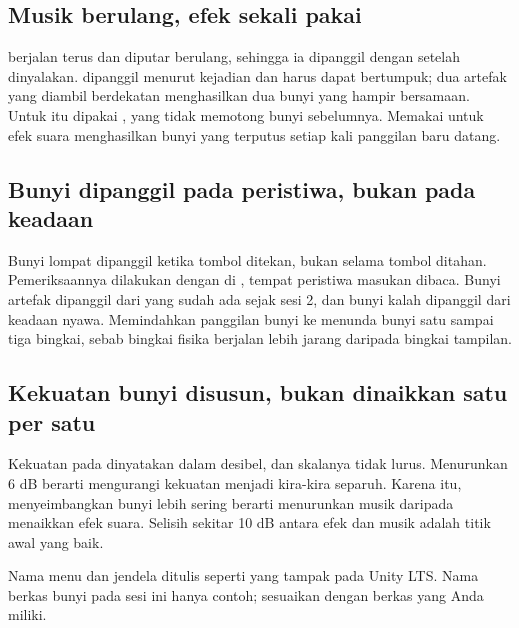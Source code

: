 \subsection*{Musik berulang, efek sekali pakai}

 berjalan terus dan diputar berulang, sehingga ia dipanggil
dengan  setelah  dinyalakan.  dipanggil
menurut kejadian dan harus dapat bertumpuk; dua artefak yang diambil berdekatan
menghasilkan dua bunyi yang hampir bersamaan. Untuk itu dipakai
, yang tidak memotong bunyi sebelumnya. Memakai
 untuk efek suara menghasilkan bunyi yang terputus setiap kali
panggilan baru datang.

\subsection*{Bunyi dipanggil pada peristiwa, bukan pada keadaan}

Bunyi lompat dipanggil ketika tombol ditekan, bukan selama tombol ditahan.
Pemeriksaannya dilakukan dengan  di ,
tempat peristiwa masukan dibaca. Bunyi artefak dipanggil dari
 yang sudah ada sejak sesi 2, dan bunyi kalah dipanggil dari
keadaan nyawa. Memindahkan panggilan bunyi ke  menunda bunyi
satu sampai tiga bingkai, sebab bingkai fisika berjalan lebih jarang daripada
bingkai tampilan.

\subsection*{Kekuatan bunyi disusun, bukan dinaikkan satu per satu}

Kekuatan pada  dinyatakan dalam desibel, dan skalanya tidak
lurus. Menurunkan 6 dB berarti mengurangi kekuatan menjadi kira-kira separuh.
Karena itu, menyeimbangkan bunyi lebih sering berarti menurunkan musik daripada
menaikkan efek suara. Selisih sekitar 10 dB antara efek dan musik adalah titik
awal yang baik.


Nama menu dan jendela ditulis seperti yang tampak pada Unity LTS. Nama berkas
bunyi pada sesi ini hanya contoh; sesuaikan dengan berkas yang Anda miliki.

